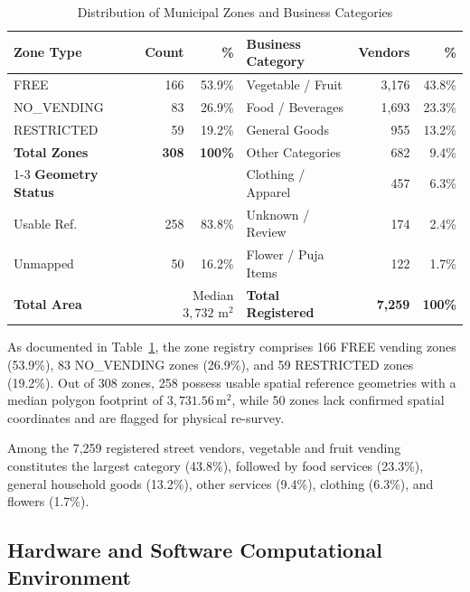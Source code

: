 \begin{table}[t]
    \caption{Distribution of Municipal Zones and Business Categories}
    \label{tab:distributions}
    \centering
    \begin{tabular}{lrr|lrr}
        \toprule
        \textbf{Zone Type} & \textbf{Count} & \textbf{\%} & \textbf{Business Category} & \textbf{Vendors} & \textbf{\%} \\
        \midrule
        FREE & 166 & 53.9\% & Vegetable / Fruit & 3,176 & 43.8\% \\
        NO\_VENDING & 83 & 26.9\% & Food / Beverages & 1,693 & 23.3\% \\
        RESTRICTED & 59 & 19.2\% & General Goods & 955 & 13.2\% \\
        \midrule
        \textbf{Total Zones} & \textbf{308} & \textbf{100\%} & Other Categories & 682 & 9.4\% \\
        \cmidrule(r){1-3}
        \textbf{Geometry Status} & & & Clothing / Apparel & 457 & 6.3\% \\
        Usable Ref. & 258 & 83.8\% & Unknown / Review & 174 & 2.4\% \\
        Unmapped & 50 & 16.2\% & Flower / Puja Items & 122 & 1.7\% \\
        \midrule
        \textbf{Total Area} & \multicolumn{2}{r|}{Median $3,732\text{ m}^2$} & \textbf{Total Registered} & \textbf{7,259} & \textbf{100\%} \\
        \bottomrule
    \end{tabular}
\end{table}

As documented in Table~\ref{tab:distributions}, the zone registry comprises 166 FREE vending zones (53.9\%), 83 NO\_VENDING zones (26.9\%), and 59 RESTRICTED zones (19.2\%). Out of 308 zones, 258 possess usable spatial reference geometries with a median polygon footprint of $3,731.56\,\text{m}^2$, while 50 zones lack confirmed spatial coordinates and are flagged for physical re-survey. 

Among the 7,259 registered street vendors, vegetable and fruit vending constitutes the largest category (43.8\%), followed by food services (23.3\%), general household goods (13.2\%), other services (9.4\%), clothing (6.3\%), and flowers (1.7\%).

\subsection{Hardware and Software Computational Environment}
\label{sec:setup_env}

